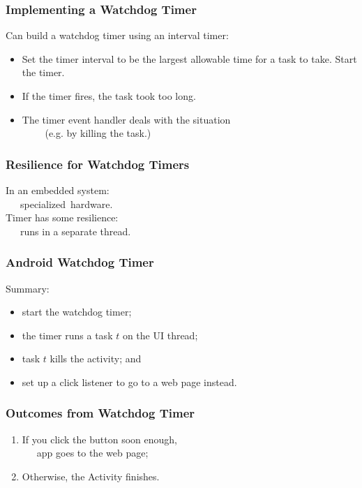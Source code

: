 \begin{frame}

\frametitle{Implementing a Watchdog Timer}

\begin{changemargin}{1cm}
Can build a watchdog timer using an interval timer:
\begin{itemize}
\item Set the timer interval to be the largest allowable time for a task
to take. Start the timer.
\item If the timer fires, the task took too long.
\item The timer event handler deals with
the situation\\~~~~ (e.g. by killing the task.)
\end{itemize}
\end{changemargin}
\end{frame}


\begin{frame}
\frametitle{Resilience for Watchdog Timers}

\Large
\begin{changemargin}{1cm}
In an embedded system: \\~~~specialized~hardware.\\[1em]

Timer has some resilience: \\~~~runs in a separate thread.
\end{changemargin}

\end{frame}

\begin{frame}
\frametitle{Android Watchdog Timer}

\begin{changemargin}{1cm}
\large
Summary: 
\begin{itemize} 
\item start the watchdog timer;
\item the timer runs a task $t$ on the UI thread;
\item task $t$ kills the activity; and
\item set up a click listener to go to a web page instead.
\end{itemize}
\end{changemargin}
\end{frame}

\begin{frame}
\frametitle{Outcomes from Watchdog Timer}
\begin{changemargin}{1cm}
\Large
\begin{enumerate}
\item If you click the button soon enough, \\
~~~app goes to the web page;
\item Otherwise, the Activity finishes.
\end{enumerate}
\end{changemargin}
\end{frame}

